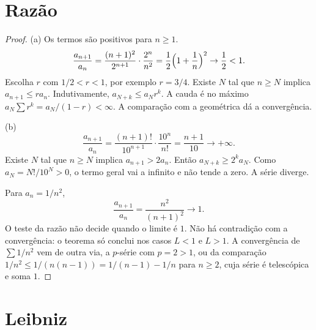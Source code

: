 \documentclass[11pt,a4paper]{article}
\begin{document}
\section{Razão}

\begin{proof}
(a) Os termos são positivos para \(n\ge 1\). 
\[
\frac{a_{n+1}}{a_n}=\frac{(n+1)^2}{2^{n+1}}\cdot\frac{2^n}{n^2}=\frac{1}{2}\Bigl(1+\frac{1}{n}\Bigr)^2\to\frac{1}{2}<1.
\]
Escolha \(r\) com \(1/2<r<1\), por exemplo \(r=3/4\). Existe \(N\) tal que \(n\ge N\) implica \(a_{n+1}\le r a_n\). Indutivamente, \(a_{N+k}\le a_N r^k\). A cauda é no máximo \(a_N\sum r^k=a_N/(1-r)<\infty\). A comparação com a geométrica dá a convergência.

(b)
\[
\frac{a_{n+1}}{a_n}=\frac{(n+1)!}{10^{n+1}}\cdot\frac{10^n}{n!}=\frac{n+1}{10}\to+\infty.
\]
Existe \(N\) tal que \(n\ge N\) implica \(a_{n+1}>2a_n\). Então \(a_{N+k}\ge 2^k a_N\). Como \(a_N=N!/10^N>0\), o termo geral vai a infinito e não tende a zero. A série diverge.

Para \(a_n=1/n^2\),
\[
\frac{a_{n+1}}{a_n}=\frac{n^2}{(n+1)^2}\to 1.
\]
O teste da razão não decide quando o limite é \(1\). Não há contradição com a convergência: o teorema só conclui nos casos \(L<1\) e \(L>1\). A convergência de \(\sum 1/n^2\) vem de outra via, a \(p\)-série com \(p=2>1\), ou da comparação \(1/n^2\le 1/(n(n-1))=1/(n-1)-1/n\) para \(n\ge 2\), cuja série é telescópica e soma \(1\).
\end{proof}

\section{Leibniz}
\end{document}
